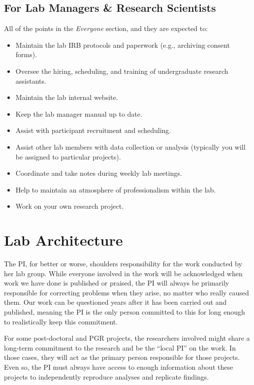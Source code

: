 \documentclass[
]{book}
\providecommand{\tightlist}{%
  \setlength{\itemsep}{0pt}\setlength{\parskip}{0pt}}
\begin{document}
\hypertarget{for-lab-managers-research-scientists}{%
\subsection{For Lab Managers \& Research Scientists}\label{for-lab-managers-research-scientists}}

All of the points in the \emph{Everyone} section, and they are expected to:

\begin{itemize}
\tightlist
\item
  Maintain the lab IRB protocols and paperwork (e.g., archiving consent forms).
\item
  Oversee the hiring, scheduling, and training of undergraduate research assistants.
\item
  Maintain the lab internal website.
\item
  Keep the lab manager manual up to date.
\item
  Assist with participant recruitment and scheduling.
\item
  Assist other lab members with data collection or analysis (typically you will be assigned to particular projects).
\item
  Coordinate and take notes during weekly lab meetings.
\item
  Help to maintain an atmosphere of professionalism within the lab.
\item
  Work on your own research project.
\end{itemize}

\hypertarget{lab-architecture}{%
\section{Lab Architecture}\label{lab-architecture}}

The PI, for better or worse, shoulders responsibility for the work conducted by her lab group. While everyone involved in the work will be acknowledged when work we have done is published or praised, the PI will always be primarily responsible for correcting problems when they arise, no matter who really caused them. Our work can be questioned years after it has been carried out and published, meaning the PI is the only person committed to this for long enough to realistically keep this commitment.

For some post-doctoral and PGR projects, the researchers involved might share a long-term commitment to the research and be the ``local PI'' on the work. In those cases, they will act as the primary person responsible for those projects. Even so, the PI must always have access to enough information about these projects to independently reproduce analyses and replicate findings.
\end{document}
